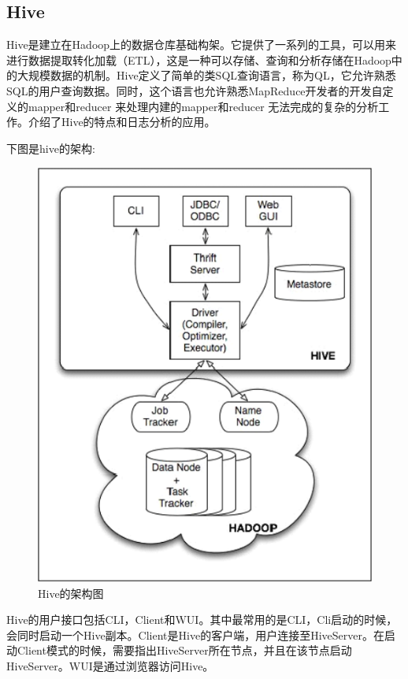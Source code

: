 \subsection{Hive}
  Hive是建立在Hadoop上的数据仓库基础构架。它提供了一系列的工具，可以用来进行数据提取转化加载（ETL），这是一种可以存储、查询和分析存储在Hadoop中的大规模数据的机制。Hive定义了简单的类SQL查询语言，称为QL，它允许熟悉SQL的用户查询数据。同时，这个语言也允许熟悉MapReduce开发者的开发自定义的mapper和reducer 来处理内建的mapper和reducer 无法完成的复杂的分析工作。\cite{dataprocess}\cite{webfenxi}介绍了Hive的特点和日志分析的应用。


  下图是hive的架构: 


\begin{figure}[!ht]
\centering
\includegraphics[scale=0.6]{photo/hive.PNG} 
\caption{Hive的架构图}
\end{figure} 


  Hive的用户接口包括CLI，Client和WUI。其中最常用的是CLI，Cli启动的时候，会同时启动一个Hive副本。Client是Hive的客户端，用户连接至HiveServer。在启动Client模式的时候，需要指出HiveServer所在节点，并且在该节点启动HiveServer。WUI是通过浏览器访问Hive。


